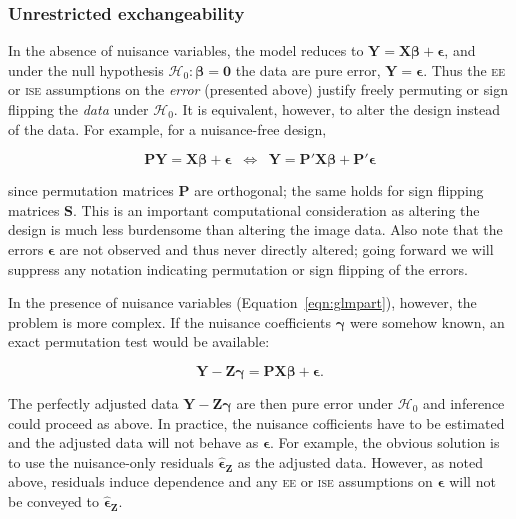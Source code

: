 \subsubsection{Unrestricted exchangeability}
\label{sec:perm:unrestricted}

In the absence of nuisance variables, the model reduces to $\mathbf{Y}=\mathbf{X}\boldsymbol{\beta}+\boldsymbol{\epsilon}$, and under the null hypothesis $\mathcal{H}_0:\boldsymbol{\beta}=\boldsymbol{0}$ the data are pure error, $\mathbf{Y}=\boldsymbol{\epsilon}$.  Thus the \textsc{ee} or \textsc{ise} assumptions on the \emph{error} (presented above) justify freely permuting or sign flipping the \emph{data} under $\mathcal{H}_0$.  It is equivalent, however, to alter the design instead of the data. For example, for a nuisance-free design,

\begin{equation}
\mathbf{P}\mathbf{Y}=\mathbf{X}\boldsymbol{\beta}+\boldsymbol{\epsilon}\;\;\Longleftrightarrow\;\;
\mathbf{Y}=\mathbf{P}'\mathbf{X}\boldsymbol{\beta}+\mathbf{P}'\boldsymbol{\epsilon}
\end{equation}

\noindent
since permutation matrices $\mathbf{P}$ are orthogonal; the same holds for sign flipping matrices $\mathbf{S}$. This is an important computational consideration as altering the design is much less burdensome than altering the image data. Also note that the errors $\boldsymbol{\epsilon}$ are not observed and thus never directly altered; going forward we will suppress any notation indicating permutation or sign flipping of the errors.

In the presence of nuisance variables (Equation~\ref{eqn:glmpart}), however, the problem is more complex. If the nuisance coefficients $\boldsymbol{\gamma}$ were somehow known, an exact permutation test would be available:

\begin{equation}
\mathbf{Y} - \mathbf{Z}\boldsymbol{\gamma} = \mathbf{P}\mathbf{X}\boldsymbol{\beta} + \boldsymbol{\epsilon}.
\end{equation}

The perfectly adjusted data $\mathbf{Y} - \mathbf{Z}\boldsymbol{\gamma}$ are then pure error under $\mathcal{H}_0$ and inference could proceed as above. In practice, the nuisance cofficients have to be estimated and the adjusted data will not behave as $\boldsymbol{\epsilon}$.  For example, the obvious solution is to use the nuisance-only residuals $\boldsymbol{\hat{\epsilon}}_{\mathbf{Z}}$ as the adjusted data.  However, as noted above, residuals induce dependence and any \textsc{ee} or \textsc{ise} assumptions on $\boldsymbol{\epsilon}$ will not be conveyed to $\boldsymbol{\hat{\epsilon}}_{\mathbf{Z}}$.

